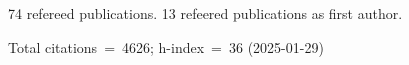 74 refereed publications. 13 refeered publications as first author.

Total citations~=~4626; h-index~=~36 (2025-01-29)